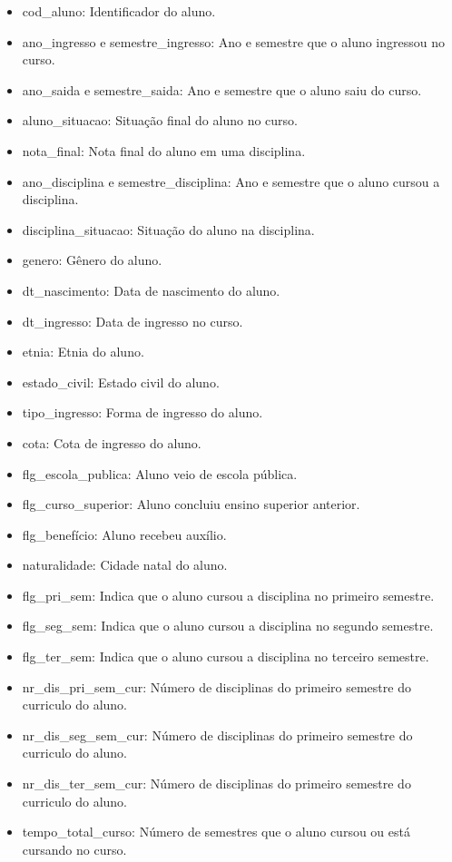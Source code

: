 \documentclass[diss,capa]{texufpel}
\begin{document}
\begin{itemize}
\item cod\_aluno: Identificador do aluno. 
\item ano\_ingresso e semestre\_ingresso: Ano e semestre que o aluno ingressou no curso. 
\item ano\_saida e semestre\_saida: Ano e semestre que o aluno saiu do curso. 
\item aluno\_situacao: Situação final do aluno no curso.
\item nota\_final: Nota final do aluno em uma disciplina. 
\item ano\_disciplina e semestre\_disciplina: Ano e semestre que o aluno cursou a disciplina. 
\item disciplina\_situacao: Situação do aluno na disciplina. 
\item genero: Gênero do aluno.
\item dt\_nascimento: Data de nascimento do aluno. 
\item dt\_ingresso: Data de ingresso no curso. 
\item etnia: Etnia do aluno. 
\item estado\_civil: Estado civil do aluno. 
\item tipo\_ingresso: Forma de ingresso do aluno.
\item cota: Cota de ingresso do aluno. 
\item flg\_escola\_publica: Aluno veio de escola pública.  
\item flg\_curso\_superior: Aluno concluiu ensino superior anterior.  
\item flg\_benefício: Aluno recebeu auxílio.  
\item naturalidade: Cidade natal do aluno.  
\item flg\_pri\_sem: Indica que o aluno cursou a disciplina no primeiro semestre.
\item flg\_seg\_sem: Indica que o aluno cursou a disciplina no segundo semestre.
\item flg\_ter\_sem: Indica que o aluno cursou a disciplina no terceiro semestre. 
\item nr\_dis\_pri\_sem\_cur: Número de disciplinas do primeiro semestre do curriculo do aluno.
\item nr\_dis\_seg\_sem\_cur: Número de disciplinas do primeiro semestre do curriculo do aluno.
\item nr\_dis\_ter\_sem\_cur: Número de disciplinas do primeiro semestre do curriculo do aluno.
\item tempo\_total\_curso: Número de semestres que o aluno cursou ou está cursando no curso. 
\end{itemize}
\end{document}
